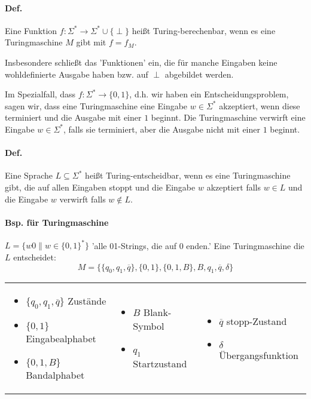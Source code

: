 \paragraph*{Def.} Eine Funktion $f:\Sigma^* \rightarrow\Sigma^* \cup \{ \perp \}$ heißt Turing-berechenbar, wenn es eine Turingmaschine $M$ gibt mit $f=f_M$.

\par\medskip
Insbesondere schließt das 'Funktionen' ein, die für manche Eingaben keine wohldefinierte Ausgabe haben bzw. auf $\perp$ abgebildet werden.\par\medskip

Im Spezialfall, dass $f:\Sigma^* \rightarrow \{ 0,1 \}$, d.h. wir haben ein Entscheidungsproblem, sagen wir, dass eine Turingmaschine eine Eingabe $w \in \Sigma^*$ akzeptiert, wenn diese terminiert und die Ausgabe mit einer $1$ beginnt. Die Turingmaschine verwirft eine Eingabe $w \in \Sigma^*$, falls sie terminiert, aber die Ausgabe nicht mit einer $1$ beginnt.\par\medskip

\paragraph*{Def.} Eine Sprache $L \subseteq \Sigma^*$ heißt Turing-entscheidbar, wenn es eine Turingmaschine gibt, die auf allen Eingaben stoppt und die Eingabe $w$ akzeptiert falls $w \in L$ und die Eingabe $w$ verwirft falls $w \not\in L$.

\paragraph*{Bsp. für Turingmaschine} $L=\{ w0\|w \in \{ 0,1 \}^* \}$ 'alle 01-Strings, die auf 0 enden.' Eine Turingmaschine die $L$ entscheidet: $$ M=\{ \{q_0,q_1,\overline{q}\}, \{0,1\}, \{0,1,B\}, B, q_1, \overline{q}, \delta \} $$

\begin{tabular}{lll}
\parbox{5cm}{
	\begin{itemize}
	\item[] $\{q_0,q_1,\overline{q}\}$ Zustände
	\item[] $\{0,1\}$ Eingabealphabet
	\item[] $\{0,1,B\}$ Bandalphabet
	\end{itemize}
} &
\parbox{5cm}{
	\begin{itemize}
	\item[] $B$ Blank-Symbol
	\item[] $q_1$ Startzustand
	\end{itemize}
} &
\parbox{5cm}{
	\begin{itemize}
	\item[] $\overline{q}$ stopp-Zustand
	\item[] $\delta$ Übergangsfunktion
	\end{itemize}
}
\end{tabular}

